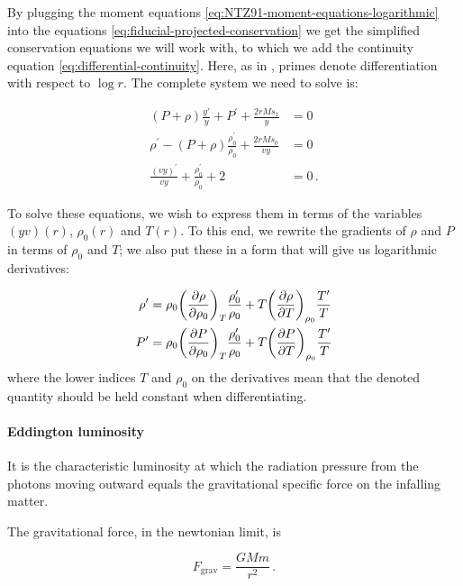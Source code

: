 \documentclass[main.tex]{subfiles}
\begin{document}
By plugging the moment equations \eqref{eq:NTZ91-moment-equations-logarithmic} into the equations \eqref{eq:fiducial-projected-conservation} we get the simplified conservation equations we will work with, to which we add the continuity equation \eqref{eq:differential-continuity}. Here, as in \cite[]{NobiliTurollaZampieri:1991dec}, primes denote differentiation with respect to \(\log r\). The complete system we need to solve is:

\begin{subequations}
\begin{align}
  (P + \rho) \frac{y'}{y} + P^\prime + \frac{2rM s_1}{y}  &= 0  \\
  \rho^\prime - (P + \rho) \frac{\rho_0^\prime}{\rho_0} + \frac{2rM s_0}{vy}   &=0  \\
  \frac{(vy)^\prime}{vy} + \frac{\rho_0 ^\prime}{\rho_0} + 2 &=0\,.
\end{align}
\end{subequations}

To solve these equations, we wish to express them in terms of the variables \((yv)(r)\), \(\rho_0(r)\) and \(T(r)\).
To this end, we rewrite the gradients of \(\rho\) and \(P\) in terms of \(\rho_0\) and \(T\); we also put these in a form that will give us logarithmic derivatives:

\begin{subequations}
\begin{align}
  \rho'  &= \rho_0 \qty(\pdv{\rho}{\rho_0})_T \frac{\rho_0'}{\rho_0}
      + T \qty(\pdv{\rho}{T} )_{\rho_0} \frac{T'}{T} \\
  P'  &= \rho_0 \qty(\pdv{P}{\rho_0})_T \frac{\rho_0'}{\rho_0}
      + T \qty(\pdv{P}{T} )_{\rho_0} \frac{T'}{T}
\end{align}
\end{subequations}
where the lower indices \(T\) and \(\rho_0\) on the derivatives mean that the denoted quantity should be held constant when differentiating.

\paragraph{Eddington luminosity}

It is the characteristic luminosity at which the radiation pressure from the photons moving outward equals the gravitational specific force on the infalling matter.

The gravitational force, in the newtonian  limit, is

\begin{equation}
  F_{\text{grav}} = \frac{GMm}{r^2 }\,.
\end{equation}
\end{document}
